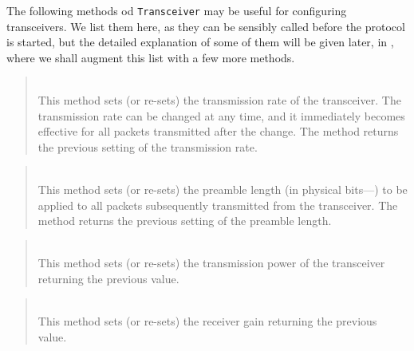 The following methods od {\tt Transceiver} may be useful for configuring
transceivers.
We list them here,
as they can be sensibly called before the protocol is started,
but the detailed explanation of some of them will be given later, in
, where we shall augment this list with a few more methods.

\begin{quote}
\noindent{} \hspace{0in}\vspace{0.05in}\\
\noindent
This method sets (or re-sets) the transmission rate of the transceiver.
The transmission rate can be changed at any time, and it immediately
becomes effective for all packets transmitted after the change.
The method returns the previous setting of the transmission rate.
\end{quote}

\begin{quote}
\noindent{} \hspace{0in}\vspace{0.05in}\\
\noindent
This method sets (or re-sets) the preamble length
(in physical bits---)
to be applied to all
packets subsequently transmitted from the transceiver.
The method returns the previous setting of the preamble length.
\end{quote}

\begin{quote}
\noindent{} \hspace{0in}\vspace{0.05in}\\
\noindent
This method sets (or re-sets) the transmission power of the transceiver
returning the previous value.
\end{quote}

\begin{quote}
\noindent{} \hspace{0in}\vspace{0.05in}\\
\noindent
This method sets (or re-sets) the receiver gain
returning the previous value.
\end{quote}


